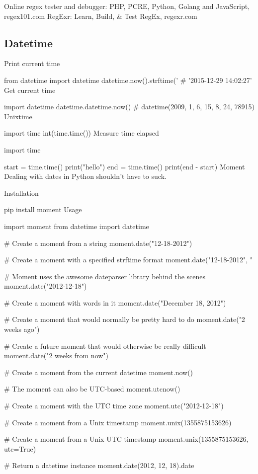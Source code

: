 Online regex tester and debugger: PHP, PCRE, Python, Golang and JavaScript, regex101.com
RegExr: Learn, Build, & Test RegEx, regexr.com

\subsection{Datetime}

Print current time

from datetime import datetime
datetime.now().strftime('%
# '2015-12-29 14:02:27'
Get current time

import datetime
datetime.datetime.now()
# datetime(2009, 1, 6, 15, 8, 24, 78915)
Unixtime

import time
int(time.time())
Measure time elapsed

import time

start = time.time()
print("hello")
end = time.time()
print(end - start)
Moment
Dealing with dates in Python shouldn't have to suck.

Installation

pip install moment
Usage

import moment
from datetime import datetime

# Create a moment from a string
moment.date("12-18-2012")

# Create a moment with a specified strftime format
moment.date("12-18-2012", "%

# Moment uses the awesome dateparser library behind the scenes
moment.date("2012-12-18")

# Create a moment with words in it
moment.date("December 18, 2012")

# Create a moment that would normally be pretty hard to do
moment.date("2 weeks ago")

# Create a future moment that would otherwise be really difficult
moment.date("2 weeks from now")

# Create a moment from the current datetime
moment.now()

# The moment can also be UTC-based
moment.utcnow()

# Create a moment with the UTC time zone
moment.utc("2012-12-18")

# Create a moment from a Unix timestamp
moment.unix(1355875153626)

# Create a moment from a Unix UTC timestamp
moment.unix(1355875153626, utc=True)

# Return a datetime instance
moment.date(2012, 12, 18).date


